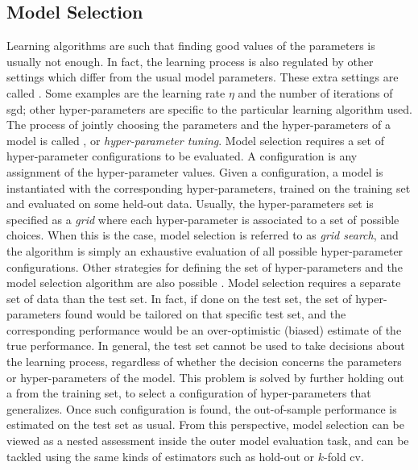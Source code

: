 \subsection{Model Selection}
Learning algorithms are such that finding good values of the parameters is usually not enough. In fact, the learning process is also regulated by other settings which differ from the usual model parameters. These extra settings are called . Some examples are the learning rate $\eta$ and the number of iterations of \gls{sgd}; other hyper-parameters are specific to the particular learning algorithm used. The process of jointly choosing the parameters and the hyper-parameters of a model is called , or \emph{hyper-parameter tuning}. Model selection requires a set of hyper-parameter configurations to be evaluated. A configuration is any assignment of the hyper-parameter values. Given a configuration, a model is instantiated with the corresponding hyper-parameters, trained on the training set and evaluated on some held-out data. Usually, the hyper-parameters set is specified as a \emph{grid} where each hyper-parameter is associated to a set of possible choices. When this is the case, model selection is referred to as \emph{grid search}, and the algorithm is simply an exhaustive evaluation of all possible hyper-parameter configurations. Other strategies for defining the set of hyper-parameters and the model selection algorithm are also possible \citep{bergstra2009randomsearch,bergstra2012hyperopt}. Model selection requires a separate set of data than the test set. In fact, if done on the test set, the set of hyper-parameters found would be tailored on that specific test set, and the corresponding performance would be an over-optimistic (biased) estimate of the true performance. In general, the test set cannot be used to take decisions about the learning process, regardless of whether the decision concerns the parameters or hyper-parameters of the model. This problem is solved by further holding out a  from the training set, to select a configuration of hyper-parameters that generalizes. Once such configuration is found, the out-of-sample performance is estimated on the test set as usual. From this perspective, model selection can be viewed as a nested assessment inside the outer model evaluation task, and can be tackled using the same kinds of estimators such as hold-out or $k$-fold \gls{cv}.

